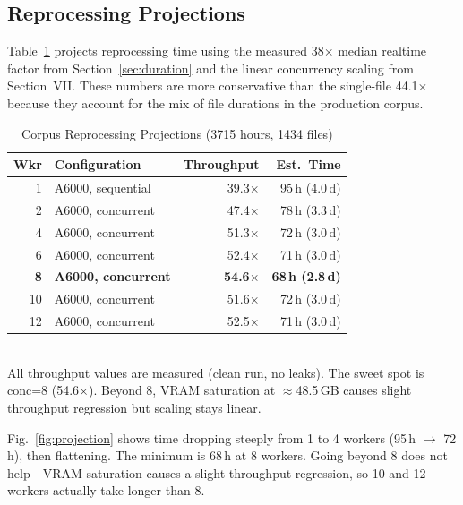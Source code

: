 \documentclass[conference,10pt]{IEEEtran}
\begin{document}
\subsection{Reprocessing Projections}

Table~\ref{tab:projections} projects reprocessing time using the measured
38$\times$ median realtime factor from Section~\ref{sec:duration} and the
linear concurrency scaling from Section~VII. These numbers are more
conservative than the single-file 44.1$\times$ because they account for the
mix of file durations in the production corpus.

\begin{table}[!t]
\centering
\caption{Corpus Reprocessing Projections (\num{3715} hours, \num{1434} files)}
\label{tab:projections}
\begin{tabular}{@{}rlrr@{}}
\toprule
\textbf{Wkr} & \textbf{Configuration} & \textbf{Throughput} & \textbf{Est.\ Time} \\
\midrule
1  & A6000, sequential     & 39.3$\times$ &  95\,h (4.0\,d) \\
2  & A6000, concurrent     & 47.4$\times$ &  78\,h (3.3\,d) \\
4  & A6000, concurrent     & 51.3$\times$ &  72\,h (3.0\,d) \\
6  & A6000, concurrent     & 52.4$\times$ &  71\,h (3.0\,d) \\
\textbf{8}  & \textbf{A6000, concurrent} & \textbf{54.6$\times$} & \textbf{68\,h (2.8\,d)} \\
10 & A6000, concurrent     & 51.6$\times$ &  72\,h (3.0\,d) \\
12 & A6000, concurrent     & 52.5$\times$ &  71\,h (3.0\,d) \\
\bottomrule
\end{tabular}
\\[4pt]
{\footnotesize All throughput values are measured (clean run, no leaks).
  The sweet spot is conc=8 (54.6$\times$). Beyond 8, VRAM saturation at
  $\approx$48.5\,GB causes slight throughput regression but scaling stays
  linear.}
\end{table}

Fig.~\ref{fig:projection} shows time dropping steeply from 1 to 4 workers
(95\,h $\to$ 72\,h), then flattening. The minimum is 68\,h at 8 workers.
Going beyond 8 does not help---VRAM saturation causes a slight throughput
regression, so 10 and 12 workers actually take longer than 8.
\end{document}

